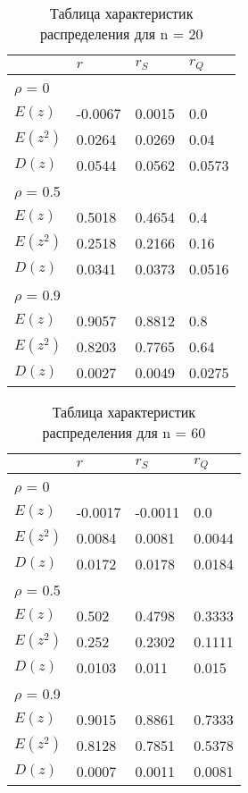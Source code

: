 \begin{table}[H]
\centering
    \begin{tabular}{|l||l|l|l|}
    \hline
         &  $r$ &   $r_S$   &   $r_Q$ \\ \hline \hline
         $\rho$ = 0& & &  \\ \hline
         $E(z)$ & -0.0067 & 0.0015 & 0.0 \\ \hline
         $E(z^2)$& 0.0264 & 0.0269 & 0.04     \\ \hline
         $D(z)$& 0.0544 & 0.0562 & 0.0573     \\ \hline
       \hline
         $\rho$ = 0.5& & &  \\ \hline
         $E(z)$ & 0.5018 & 0.4654 & 0.4       \\ \hline
         $E(z^2)$ & 0.2518 & 0.2166 & 0.16       \\ \hline
          $D(z)$& 0.0341 & 0.0373 & 0.0516 \\ \hline
        \hline
        $\rho$ = 0.9& & &  \\ \hline
        $E(z)$ & 0.9057 & 0.8812 & 0.8        \\ \hline
         $E(z^2)$& 0.8203 & 0.7765 & 0.64       \\ \hline
          $D(z)$ & 0.0027 & 0.0049 & 0.0275 \\ \hline
    \end{tabular}
     \caption{Таблица характеристик распределения для n = 20}
    \label{tab:my_label}
\end{table}

\begin{table}[H]
\centering
    \begin{tabular}{|l||l|l|l|}
    \hline
         &  $r$ &   $r_S$   &   $r_Q$ \\ \hline \hline
         $\rho$ = 0& & &  \\ \hline
         $E(z)$ & -0.0017 & -0.0011 & 0.0 \\ \hline
         $E(z^2)$&  0.0084 & 0.0081 & 0.0044   \\ \hline
         $D(z)$&0.0172 & 0.0178 & 0.0184     \\ \hline
       \hline
         $\rho$ = 0.5& & &  \\ \hline
         $E(z)$ &  0.502 & 0.4798 & 0.3333       \\ \hline
         $E(z^2)$ & 0.252 & 0.2302 & 0.1111   \\ \hline
          $D(z)$& 0.0103 & 0.011 & 0.015 \\ \hline
        \hline
        $\rho$ = 0.9& & &  \\ \hline
        $E(z)$ & 0.9015 & 0.8861 & 0.7333        \\ \hline
         $E(z^2)$&  0.8128 & 0.7851 & 0.5378      \\ \hline
          $D(z)$ & 0.0007 & 0.0011 & 0.0081 \\ \hline
    \end{tabular}
     \caption{Таблица характеристик распределения для n = 60}
    \label{tab:my_label}
\end{table}

